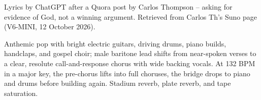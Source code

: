 
\begin{notes}
Lyrics by ChatGPT after a Quora post by Carlos Thompson -- asking for evidence of God, not a winning argument. Retrieved from Carlos Th's Suno page (V6-MINI, 12 October 2026).
\end{notes}
\begin{style}
Anthemic pop with bright electric guitars, driving drums, piano builds, handclaps, and gospel choir; male baritone lead shifts from near-spoken verses to a clear, resolute call-and-response chorus with wide backing vocals. At 132 BPM in a major key, the pre-chorus lifts into full choruses, the bridge drops to piano and drums before building again. Stadium reverb, plate reverb, and tape saturation.
\end{style}
